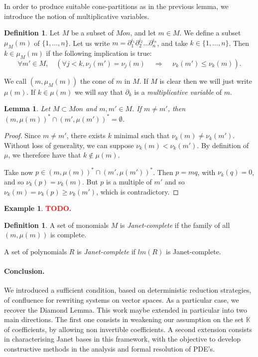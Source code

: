 \documentclass[10pt]{easychair}
\newtheorem{lemma}[theorem]{Lemma}
\theoremstyle{definition}
\newtheorem{definition}[theorem]{Definition}
\newtheorem{example}[theorem]{Example}
\newcommand\todo[1]{{\bf\textcolor{red}{#1.}}}
\newcommand\K{\mathbb{K}}
\begin{document}
In order to produce suitable cone-partitions as in the previous lemma, we introduce the notion of multiplicative variables.

\begin{definition}
  Let $M$ be a subset of $Mon$, and let $m  \in M$. We define a subset $\mu_M(m)$ of $\{1,\ldots,n\}$. Let us write $m = \partial_1^{i_1}\partial_2^{i_2}\ldots \partial_n^{i_n}$, and take $k \in \{1,\ldots,n\}$. Then $k \in \mu_M(m)$ if the following implication is true:
  \[
\forall m' \in M, \quad (\forall j < k, \nu_j(m') = \nu_j(m) \, \quad \Rightarrow \quad \, \nu_k(m') \leq \nu_k(m)).
  \]
  

  We call $(m,\mu_M(m))$ the cone of $m$ in $M$. If $M$ is clear then we will just write $\mu(m)$. If $k \in \mu(m)$ we will say that $\partial_k$ is a \emph{multiplicative variable} of $m$.
\end{definition}

\begin{lemma}\label{lem:multiplicative_cones_disjoint}
Let $M \subset Mon$ and $m,m' \in M$. If $m \neq m'$, then $(m,\mu(m))^* \cap (m',\mu(m'))^* = \emptyset$.
\end{lemma}
\begin{proof}
   Since $m \neq m'$, there exists $k$ minimal such that $\nu_k(m) \neq \nu_k(m')$. Without loss of generality, we can suppose $\nu_k(m) < \nu_k(m')$. By definition of $\mu$, we therefore have that $k \notin \mu(m)$.

   Take now $p \in (m,\mu(m))^* \cap (m',\mu(m'))^*$. Then $p = mq$, with $\nu_k(q) = 0$, and so $\nu_k(p) = \nu_k(m)$. But $p$ is a multiple of $m'$ and so $\nu_k(m) = \nu_k(p) \geq \nu_k(m')$, which is contradictory.
 \end{proof}

 \begin{example}
\todo{TODO}
 \end{example}

 \begin{definition}
   A set of monomials $M$ is \emph{Janet-complete} if the family of all $(m,\mu(m))$ is complete.

   A set of polynomials $R$ is \emph{Janet-complete} if $lm(R)$ is Janet-complete.
\end{definition}




\paragraph{Conclusion.} We introduced a sufficient condition, based on deterministic reduction strategies, of confluence for rewriting systems on vector spaces. As a particular case, we recover the Diamond Lemma. This work maybe extended in particular into two main directions. The first one consists in weakening our assumption on the set $\K$ of coefficients, by allowing non invertible coefficients. A second extension consists in characterising Janet bases in this framework, with the objective to develop constructive methods in the analysis and formal resolution of PDE's.


\end{document}
